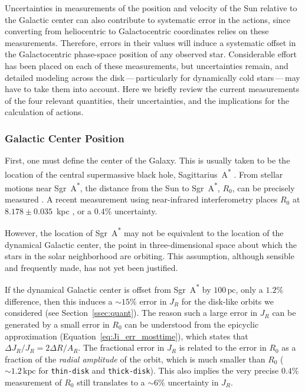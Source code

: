 \documentclass[twocolumn]{aastex62}
\newcommand{\pc}{\text{pc}}
\newcommand{\kpc}{\text{kpc}}
\newcommand{\sgra}{Sgr~A\textsuperscript{*}}
\newcommand{\thin}{\texttt{thin-disk}}
\newcommand{\thick}{\texttt{thick-disk}}
\begin{document}
Uncertainties in measurements of the position and velocity of the Sun relative
to the Galactic center can also contribute to systematic error in the actions,
since converting from heliocentric to Galactocentric coordinates relies on
these measurements. Therefore, errors in their values will induce a systematic
offset in the Galactocentric phase-space position of any observed star.
Considerable effort has been placed on each of these measurements, but
uncertainties remain, and detailed modeling across the disk\,---\,particularly
for dynamically cold stars\,---\,may have to take them into account. Here we
briefly review the current measurements of the four relevant quantities, their
uncertainties, and the implications for the calculation of actions.

\subsubsection{Galactic Center Position}
First, one must define the center of the Galaxy. This is usually taken to be
the location of the central supermassive black hole,
Sagittarius~A\textsuperscript{*} \citep[\sgra{},
e.g.,][]{2004ApJ...616..872R}. From stellar motions near
\sgra{}, the distance from the Sun to \sgra{}, $R_0$, can be
precisely measured \citep{2009ApJ...692.1075G, 2018AA...615L..15G}. A recent
measurement using near-infrared interferometry places $R_0$ at $8.178 \pm
0.035$~kpc \citep{2019arXiv190405721A}, or a $0.4\%$ uncertainty.

However, the location of \sgra{} may not be equivalent to the location of the
dynamical Galactic center, the point in three-dimensional space about which
the stars in the solar neighborhood are orbiting. This assumption, although
sensible and frequently made, has not yet been justified.

If the dynamical Galactic center is offset from \sgra{} by $100\,\pc$, only a
$1.2\%$ difference, then this induces a $\sim15\%$ error in $J_R$ for the
disk-like orbits we considered (see Section~\ref{ssec:quant}). The reason such
a large error in $J_R$ can be generated by a small error in $R_0$ can be
understood from the epicyclic approximation
(Equation~\eqref{eq:Ji_err_mosttime}), which states that $\Delta J_R/J_R =
2\Delta R/A_R$. The fractional error in $J_R$ is related to the error in $R_0$
as a fraction of the \emph{radial amplitude} of the orbit, which is much
smaller than $R_0$ ($\sim1.2\,\kpc$ for \thin{} and \thick{}). This also
implies the very precise $0.4\%$ measurement of $R_0$ still translates to a
$\sim6\%$ uncertainty in $J_R$.
\end{document}
